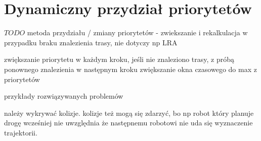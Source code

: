 \section{Dynamiczny przydział priorytetów}
\label{ch:alg-priorities-allocation}

$TODO$ metoda przydziału / zmiany priorytetów - zwiekszanie i rekalkulacja w przypadku braku znalezienia trasy, nie dotyczy np LRA

zwiększanie priorytetu w każdym kroku, jeśli nie znaleziono trasy, z próbą ponownego znalezienia w następnym kroku
zwiększanie okna czasowego do max z priorytetów

przykłady rozwiązywanych problemów

należy wykrywać kolizje. kolizje też mogą się zdarzyć, bo np robot który planuje drogę wcześniej nie uwzględnia że następnemu robotowi nie uda się wyznaczenie trajektorii.
